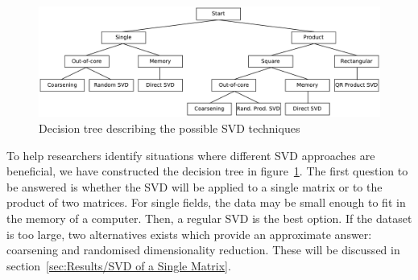 \documentclass[ijgi,article,submit,moreauthors,pdftex,10pt,a4paper]{Definitions/mdpi}
\begin{document}
%
%


\begin{figure}[H]
\centering
\includegraphics[width=\textwidth]{Results/FlowDiagram.pdf}
\caption{Decision tree describing the possible SVD techniques}
\label{fig:FlowDiagram}
\end{figure}

To help researchers identify situations where different SVD approaches are beneficial, we have constructed the decision tree in figure~\ref{fig:FlowDiagram}. The first question to be answered is whether the SVD will be applied to a single matrix or to the product of two matrices. For single fields, the data may be small enough to fit in the memory of a computer. Then, a regular SVD is the best option. If the dataset is too large, two alternatives exists which provide an approximate answer: coarsening and randomised dimensionality reduction. These will be discussed in section~\ref{sec:Results/SVD of a Single Matrix}.
\end{document}

